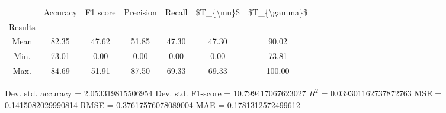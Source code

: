 \begin{tabular}{|c|c|c|c|c|c|c|}
\toprule
{} &  Accuracy &  F1 score &  Precision &  Recall &  \$T\_\{\textbackslash mu\}\$ &  \$T\_\{\textbackslash gamma\}\$ \\
Results &           &           &            &         &            &               \\
\hline
Mean    &     82.35 &     47.62 &      51.85 &   47.30 &      47.30 &         90.02 \\
Min.    &     73.01 &      0.00 &       0.00 &    0.00 &       0.00 &         73.81 \\
Max.    &     84.69 &     51.91 &      87.50 &   69.33 &      69.33 &        100.00 \\
\bottomrule
\end{tabular}

 Dev. std. accuracy = 2.053319815506954
 Dev. std. F1-score = 10.799417067623027
 $R^2$ = 0.039301162737872763
 MSE = 0.1415082029990814
 RMSE = 0.37617576078089004
 MAE = 0.1781312572499612